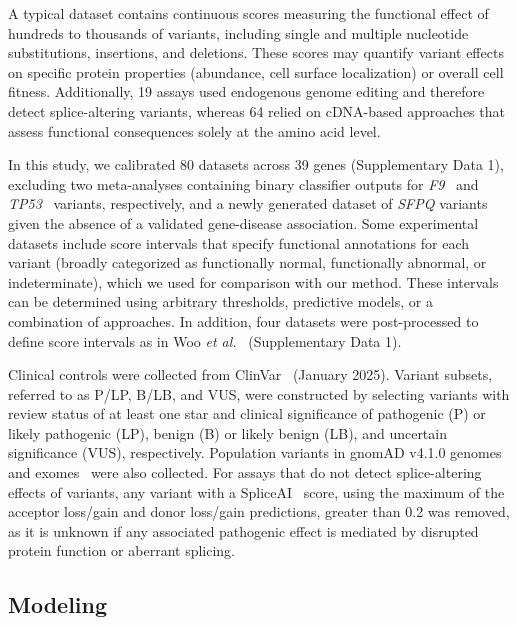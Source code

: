 \documentclass[11pt]{article}
\theoremstyle{plain}
\newcommand{\NumDatasets}{80 }
\newcommand{\NumGenesCalibrated}{39 }
\begin{document}
A typical dataset contains continuous scores measuring the functional effect of hundreds to thousands of variants, including single and multiple nucleotide substitutions, insertions, and deletions. These scores may quantify variant effects on specific protein properties (abundance, cell surface localization) or overall cell fitness. Additionally, 19 assays used endogenous genome editing and therefore detect splice-altering variants, whereas 64 relied on cDNA-based approaches that assess functional consequences solely at the amino acid level.

In this study, we calibrated \NumDatasets datasets across \NumGenesCalibrated genes (Supplementary Data 1), excluding two meta-analyses containing binary classifier outputs for \textit{F9}~\cite{popp2024multiplex} and \textit{TP53}~\cite{Fayer2021} variants, respectively, and a newly generated dataset of \textit{SFPQ} variants~\cite{igvf_pp} given the absence of a validated gene-disease association. Some experimental datasets include score intervals that specify functional annotations for each variant (broadly categorized as functionally normal, functionally abnormal, or indeterminate), which we used for comparison with our method. These intervals can be determined using arbitrary thresholds, predictive models, or a combination of approaches. In addition, 
four datasets were post-processed to define score intervals as in Woo \textit{et al.}~\cite{woo2025bard1_sge} (Supplementary Data 1).

Clinical controls were collected from ClinVar~\cite{landrum2018clinvar} (January 2025). Variant subsets, referred to as P/LP, B/LB, and VUS, were constructed by selecting variants with review status of at least one star and clinical significance of pathogenic (P) or likely pathogenic (LP), benign (B) or likely benign (LB), and uncertain significance (VUS), respectively. Population variants in gnomAD v4.1.0 genomes and exomes~\cite{chen2024_gnomad} were also collected. For assays that do not detect splice-altering effects of variants, any variant with a SpliceAI~\cite{jaganathan2019predicting} score, using the maximum of the acceptor loss/gain and donor loss/gain predictions, greater than 0.2 \cite{Walker2023} was removed, as it is unknown if any associated pathogenic effect is mediated by disrupted protein function or aberrant splicing.


\subsection*{Modeling}
\end{document}
